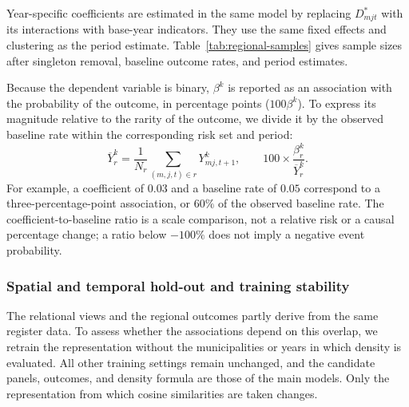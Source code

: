 \documentclass[9pt,twoside]{pnas-new}
\begin{document}
Year-specific coefficients are estimated in the same model by replacing $D^{*}_{mjt}$ with its interactions with base-year indicators. They use the same fixed effects and clustering as the period estimate. Table~\ref{tab:regional-samples} gives sample sizes after singleton removal, baseline outcome rates, and period estimates.

Because the dependent variable is binary, $\beta^k$ is reported as an association with the probability of the outcome, in percentage points ($100\beta^k$). To express its magnitude relative to the rarity of the outcome, we divide it by the observed baseline rate within the corresponding risk set and period:
\[
\overline{Y}^{k}_{r}=\frac{1}{N_r}\sum_{(m,j,t)\in r}Y^{k}_{mj,t+1},
\qquad
100\times\frac{\beta^{k}_{r}}{\overline{Y}^{k}_{r}}.
\]
For example, a coefficient of $0.03$ and a baseline rate of $0.05$ correspond to a three-percentage-point association, or $60\%$ of the observed baseline rate. The coefficient-to-baseline ratio is a scale comparison, not a relative risk or a causal percentage change; a ratio below $-100\%$ does not imply a negative event probability.

\subsubsection{Spatial and temporal hold-out and training stability}
\label{subsubsec:holdout}

The relational views and the regional outcomes partly derive from the same register data. To assess whether the associations depend on this overlap, we retrain the representation without the municipalities or years in which density is evaluated. All other training settings remain unchanged, and the candidate panels, outcomes, and density formula are those of the main models. Only the representation from which cosine similarities are taken changes.
\end{document}
